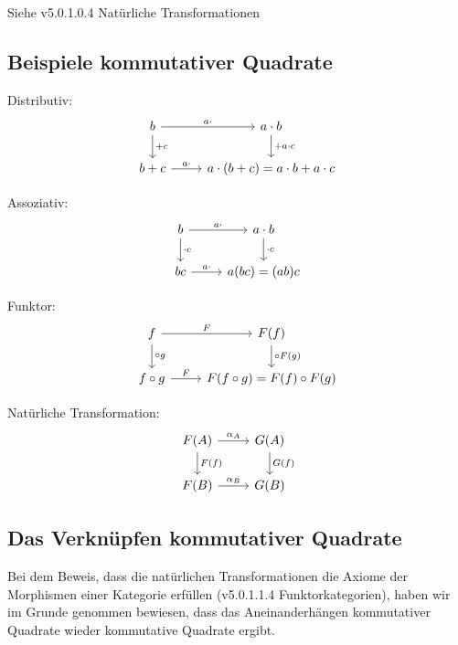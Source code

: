 \documentclass[a4paper]{amsart}
\theoremstyle{definition}
\begin{document}
Siehe v5.0.1.0.4 Natürliche Transformationen

\subsection{Beispiele kommutativer Quadrate}

Distributiv:
\begin{equation}
    \begin{tikzcd}
        b   \arrow[d, "+ c"]  \arrow[r, "a \cdot"] & a \cdot b \arrow[d, "+ a \cdot c"]\\
        b+c                   \arrow[r, "a \cdot"] & a \cdot (b+c) = a \cdot b+a \cdot c
    \end{tikzcd}
\end{equation}

Assoziativ:
\begin{equation}
    \begin{tikzcd}
    b   \arrow[d, "\cdot c"]  \arrow[r, "a \cdot"] & a \cdot b \arrow[d, "\cdot c"]\\
    b c                   \arrow[r, "a \cdot"] & a (bc) = (ab) c
\end{tikzcd}
\end{equation}

Funktor:
\begin{equation}
    \begin{tikzcd}
        f   \arrow[d, "\circ g"]  \arrow[r, "F"] & F(f) \arrow[d, "\circ F(g)"]\\
        f \circ g                   \arrow[r, "F"] & F(f \circ g) = F(f) \circ F(g)
    \end{tikzcd}
\end{equation}

Natürliche Transformation:
\begin{equation}
    \begin{tikzcd}
        F(A)   \arrow[d, "F(f)"]  \arrow[r, "\alpha_A"] & G(A) \arrow[d, "G(f)"]\\
        F(B)                      \arrow[r, "\alpha_B"] & G(B)
    \end{tikzcd}
\end{equation}

\subsection{Das Verknüpfen kommutativer Quadrate}
Bei dem Beweis, dass die natürlichen Transformationen die Axiome der Morphismen einer Kategorie erfüllen (v5.0.1.1.4 Funktorkategorien), haben wir im Grunde genommen bewiesen, dass das Aneinanderhängen kommutativer Quadrate wieder kommutative Quadrate ergibt.
\end{document}
